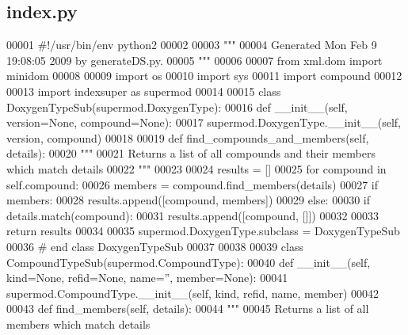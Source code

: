 \subsection{index.\+py}
\label{index_8py_source}

\begin{DoxyCode}
00001 \textcolor{comment}{#!/usr/bin/env python2}
00002 
00003 \textcolor{stringliteral}{"""}
00004 \textcolor{stringliteral}{Generated Mon Feb  9 19:08:05 2009 by generateDS.py.}
00005 \textcolor{stringliteral}{"""}
00006 
00007 \textcolor{keyword}{from} xml.dom \textcolor{keyword}{import} minidom
00008 
00009 \textcolor{keyword}{import} os
00010 \textcolor{keyword}{import} sys
00011 \textcolor{keyword}{import} compound
00012 
00013 \textcolor{keyword}{import} indexsuper \textcolor{keyword}{as} supermod
00014 
00015 \textcolor{keyword}{class }DoxygenTypeSub(supermod.DoxygenType):
00016     \textcolor{keyword}{def }__init__(self, version=None, compound=None):
00017         supermod.DoxygenType.\_\_init\_\_(self, version, compound)
00018 
00019     \textcolor{keyword}{def }find_compounds_and_members(self, details):
00020         \textcolor{stringliteral}{"""}
00021 \textcolor{stringliteral}{        Returns a list of all compounds and their members which match details}
00022 \textcolor{stringliteral}{        """}
00023 
00024         results = []
00025         \textcolor{keywordflow}{for} compound \textcolor{keywordflow}{in} self.compound:
00026             members = compound.find\_members(details)
00027             \textcolor{keywordflow}{if} members:
00028                 results.append([compound, members])
00029             \textcolor{keywordflow}{else}:
00030                 \textcolor{keywordflow}{if} details.match(compound):
00031                     results.append([compound, []])
00032 
00033         \textcolor{keywordflow}{return} results
00034 
00035 supermod.DoxygenType.subclass = DoxygenTypeSub
00036 \textcolor{comment}{# end class DoxygenTypeSub}
00037 
00038 
00039 \textcolor{keyword}{class }CompoundTypeSub(supermod.CompoundType):
00040     \textcolor{keyword}{def }__init__(self, kind=None, refid=None, name='', member=None):
00041         supermod.CompoundType.\_\_init\_\_(self, kind, refid, name, member)
00042 
00043     \textcolor{keyword}{def }find_members(self, details):
00044         \textcolor{stringliteral}{"""}
00045 \textcolor{stringliteral}{        Returns a list of all members which match details}

\end{DoxyCode}
